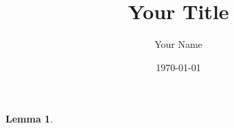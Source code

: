 \documentclass{article}
\title{Your Title}
\author{Your Name}
\date{\today}
\theoremstyle{plain}
\newtheorem{lemma}{Lemma}
\begin{document}
\begin{lemma}
    
\end{lemma}

\newpage
\printbibliography
\end{document}
